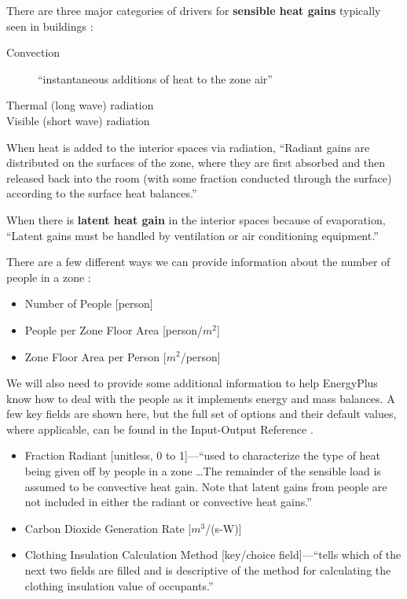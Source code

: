 \documentclass[10pt]{article}
\begin{document}
There are three major categories of drivers for \textbf{sensible heat gains} typically seen in buildings \cite{EPcourseteaching}:


\begin{description}

\item[Convection] ``instantaneous additions of heat to the zone air'' \cite{EPdocs9engineering}
\item[Thermal (long wave) radiation]
\item[Visible (short wave) radiation]
\end{description}


When heat is added to the interior spaces via radiation, ``Radiant gains
are distributed on the surfaces of the zone, where they are first absorbed and then released back
into the room (with some fraction conducted through the surface) according to the surface heat
balances.'' \cite{EPdocs9engineering} 

When there is \textbf{latent heat gain} in the interior spaces because of evaporation, ``Latent gains must
be handled by ventilation or air conditioning equipment.'' \cite{EPdocs9engineering}

There are a few different ways we can provide information about the number of people in a zone \cite{EPdocs9inputoutput}:
\vspace{-6pt}
\begin{itemize}
    \setlength{\itemsep}{0pt}%
    \setlength{\parskip}{0pt}%
\item Number of People [person]
\item People per Zone Floor Area [person/$m^2$]
\item Zone Floor Area per Person [$m^2$/person]
\end{itemize}


We will also need to provide some additional information to help EnergyPlus know how to deal with the people as it implements energy and mass balances. A few key fields are shown here, but the full set of options and their default values, where applicable, can be found in the Input-Output Reference \cite{EPdocs9inputoutput}.

\begin{itemize}
    \setlength{\itemsep}{0pt}%
    \setlength{\parskip}{0pt}%
\item Fraction Radiant [unitless, 0 to 1]---``used to characterize the type of heat being
given off by people in a zone \ldots The remainder of the sensible load is assumed to be convective heat gain. Note that latent gains
from people are not included in either the radiant or convective heat gains.'' \cite{EPdocs9inputoutput}
\item Carbon Dioxide Generation Rate [$m^3$/(s-W)]
\item Clothing Insulation Calculation Method [key/choice field]---``tells which of the next two fields are filled and is descriptive of the
method for calculating the clothing insulation value of occupants.'' \cite{EPdocs9inputoutput}
\end{itemize}
\vspace{-6pt}
\end{document}
